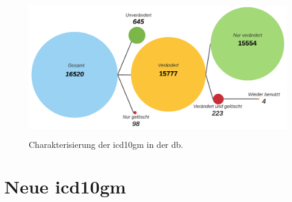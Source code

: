  
 \begin{figure}[ht]
 	\centering
 	\includegraphics[height=6cm]{figures/icd10gm_quantities}
 	\caption[\acs{icd10gm} in der \acs{db}]{Charakterisierung der \acs{icd10gm} in der \ac{db}.}
 	\label{fig:icddb}
 \end{figure}

\section{Neue \acs{icd10gm}} \label{newicd}


